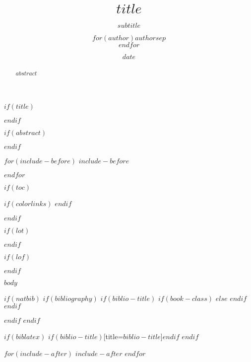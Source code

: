 \documentclass[doctor,twoside,chapterhead,otf]{znufethesis}
\title{\LARGE\textbf{$title$}}
\title{}
\subtitle{$subtitle$}
\author{$for(author)$$author$$sep$ \\ $endfor$}
\author{}
\date{$date$}
\date{}
\begin{document}
$if(title)$
\maketitle
$endif$

\cleardoublepage
\frontmatter
\pagestyle{plain}

$if(abstract)$
\begin{abstract}
$abstract$
\end{abstract}
$endif$




$for(include-before)$
$include-before$

$endfor$

$if(toc)$
{
$if(colorlinks)$
\hypersetup{linkcolor=$if(toccolor)$$toccolor$$else$black$endif$}
$endif$

\cleardoublepage
\frontmatter


\setcounter{tocdepth}{$toc-depth$}
\cleardoublepage
{} %
\tableofcontents        %
}
$endif$

$if(lot)$
\cleardoublepage
{} %
\listoftables           %
$endif$

$if(lof)$
\cleardoublepage
{} %

\listoffigures          %
$endif$

\cleardoublepage
{} %

\mainmatter
\pagestyle{mpage}

$body$

$if(natbib)$
$if(bibliography)$
$if(biblio-title)$
$if(book-class)$
\renewcommand\bibname{$biblio-title$}
$else$
\renewcommand\refname{$biblio-title$}
$endif$
$endif$


$endif$
$endif$

$if(biblatex)$
\printbibliography$if(biblio-title)$[title=$biblio-title$]$endif$
$endif$

$for(include-after)$
$include-after$
$endfor$
\end{document}

